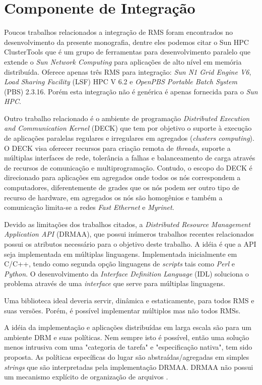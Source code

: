 \chapter{Componente de Integração}
\label{cap:drmaa}

Poucos trabalhos relacionados a integração de RMS foram encontrados no desenvolvimento da presente monografia, dentre eles podemos citar o Sun HPC ClusterTools \cite{sunhpc} que é um grupo de ferramentas para desenvolvimento paralelo que extende o \emph{Sun Network Computing} para aplicações de alto nível em memória distribuída. Oferece apenas três RMS para integração: \emph{Sun N1 Grid Engine V6}, \emph{Load Sharing Facility} (LSF) HPC V 6.2 e \emph{OpenPBS Portable Batch System} (PBS) 2.3.16. Porém esta integração não é genérica é apenas fornecida para o \emph{Sun HPC}.

Outro trabalho relacionado é o ambiente de programação \emph{Distributed Execution and Communication Kernel} (DECK) \cite{Barreto2000} que tem por objetivo o suporte à execução de aplicações paralelas regulares e irregulares em agregados (\emph{clusters computing}). O DECK visa oferecer recursos para criação remota de \emph{threads}, suporte a múltiplas interfaces de rede, tolerância a falhas e balanceamento de carga através de recursos de comunicação e multiprogramação. Contudo, o escopo do DECK é direcionado para aplicações em agregados onde todos os nós correspondem a computadores, diferentemente de grades que os nós podem ser outro tipo de recurso de hardware, em agregados os nós são homogênios e também a comunicação limita-se a redes \emph{Fast Ethernet} e \emph{Myrinet}. 

Devido as limitações dos trabalhos citados, a \emph{Distributed Resource Management Application API} (DRMAA), que possui inúmeros trabalhos recentes relacionados \cite{Ciesnik2007, Haas2004, Herrera2007, Templeton2006}  possui os atributos necessário para o objetivo deste trabalho.
A idéia é que a API seja implementada em múltiplas linguagens. Implementada inicialmente em C/C++, tendo como segunda opção linguagens de \emph{scripts} tais como \emph{Perl} e \emph{Python}. O desenvolvimento da \emph{Interface Definition Language} (IDL) soluciona o problema através de uma \emph{interface} que serve para múltiplas linguagens.

Uma biblioteca ideal deveria servir, dinâmica e estaticamente, para todos RMS e suas versões. Porém, é possível implementar múltiplos mas não todos RMSs.

A idéia da implementação e aplicações distribuídas em larga escala são para um ambiente DRM e suas políticas. Nem sempre isto é possível, então uma solução menos intrusiva com uma "categoria de tarefa" e "especificação nativa", tem sido proposta. As políticas específicas do lugar são abstraídas/agregadas em simples \emph{strings} que são interpretadas pela implementação DRMAA. DRMAA não possui um mecanismo explícito de organização de arquivos  \cite{Rajic2004}. 

